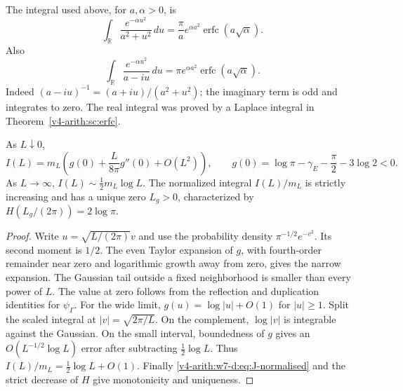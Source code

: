 \begin{remark}
\label{v4-arith:w7-d:lem:erfc}
The integral used above, for \(a,\alpha>0\), is
\begin{equation}
 \int_{\mathbb R}\frac{e^{-\alpha u^2}}{a^2+u^2}\,du
 =\frac\pi a e^{\alpha a^2}\operatorname{erfc}(a\sqrt\alpha).
 \label{v4-arith:w7-d:eq:erfc-identity}
\end{equation}
Also
\begin{equation}
 \int_{\mathbb R}\frac{e^{-\alpha u^2}}{a-iu}\,du
 =\pi e^{\alpha a^2}\operatorname{erfc}(a\sqrt\alpha).
 \label{v4-arith:w7-d:eq:erfc-imag-axis}
\end{equation}
Indeed \((a-iu)^{-1}=(a+iu)/(a^2+u^2)\); the imaginary term is odd
and integrates to zero. The real integral was proved by a Laplace
integral in Theorem~\ref{v4-arith:sc:erfc}.
\end{remark}

\begin{proposition}
\label{v4-arith:w7-d:prop:narrow}
\label{v4-arith:w7-d:prop:wide}
\label{v4-arith:w7-d:thm:lambda-c}
As \(L\downarrow0\),
\[
 I(L)=m_L\left(g(0)+\frac{L}{8\pi}g''(0)+O(L^2)\right),
 \qquad g(0)=\log\pi-\gamma_E-\frac\pi2-3\log2<0.
\]
As \(L\to\infty\), \(I(L)\sim\tfrac12m_L\log L\).
The normalized integral \(I(L)/m_L\) is strictly increasing and
has a unique zero \(L_g>0\), characterized by
\(H(L_g/(2\pi))=2\log\pi\).
\end{proposition}
\begin{proof}
Write \(u=\sqrt{L/(2\pi)}v\) and use the probability density
\(\pi^{-1/2}e^{-v^2}\). Its second moment is \(1/2\).
The even Taylor expansion of \(g\), with fourth-order remainder
near zero and logarithmic growth away from zero, gives the narrow
expansion. The Gaussian tail outside a fixed neighborhood is smaller
than every power of \(L\). The value at zero follows from the
reflection and duplication identities for \(\psi_\Gamma\).
For the wide limit, \(g(u)=\log|u|+O(1)\) for \(|u|\ge1\).
Split the scaled integral at \(|v|=\sqrt{2\pi/L}\).
On the complement, \(\log|v|\) is integrable against the Gaussian.
On the small interval, boundedness of \(g\) gives an
\(O(L^{-1/2}\log L)\) error after subtracting \(\tfrac12\log L\).
Thus \(I(L)/m_L=\tfrac12\log L+O(1)\).
Finally \eqref{v4-arith:w7-d:eq:J-normalised} and the strict decrease
of \(H\) give monotonicity and uniqueness.
\end{proof}

